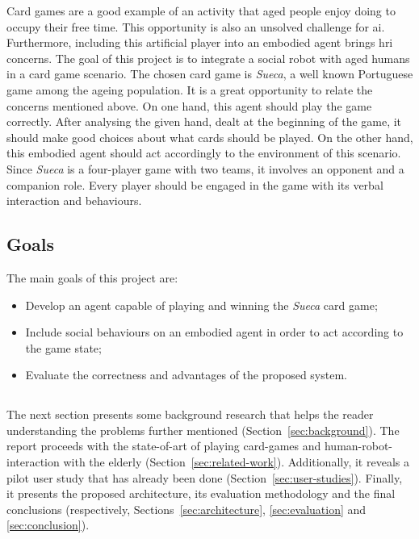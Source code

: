 Card games are a good example of an activity that aged people enjoy doing to occupy their free time.
This opportunity is also an unsolved challenge for \gls{ai}.
Furthermore, including this artificial player into an embodied agent brings \gls{hri} concerns.
The goal of this project is to integrate a social robot with aged humans in a card game scenario.
The chosen card game is \emph{Sueca}, a well known Portuguese game among the ageing population.
It is a great opportunity to relate the concerns mentioned above.
On one hand, this agent should play the game correctly.
After analysing the given hand, dealt at the beginning of the game, it should make good choices about what cards should be played.
On the other hand, this embodied agent should act accordingly to the environment of this scenario.
Since \emph{Sueca} is a four-player game with two teams, it involves an opponent and a companion role.
Every player should be engaged in the game with its verbal interaction and behaviours.


\subsection{Goals}
\label{sec:goals}

The main goals of this project are:
\begin{itemize}
\item Develop an agent capable of playing and winning the \emph{Sueca} card game;
\item Include social behaviours on an embodied agent in order to act according to the game state;
\item Evaluate the correctness and advantages of the proposed system.
\end{itemize}

\subsection*{\centering*}

The next section presents some background research that helps the reader understanding the problems further mentioned (Section~\ref{sec:background}).
The report proceeds with the state-of-art of playing card-games and human-robot-interaction with the elderly (Section~\ref{sec:related-work}).
Additionally, it reveals a pilot user study that has already been done (Section~\ref{sec:user-studies}).
Finally, it presents the proposed architecture, its evaluation methodology and the final conclusions (respectively, Sections~\ref{sec:architecture}, \ref{sec:evaluation} and \ref{sec:conclusion}).


